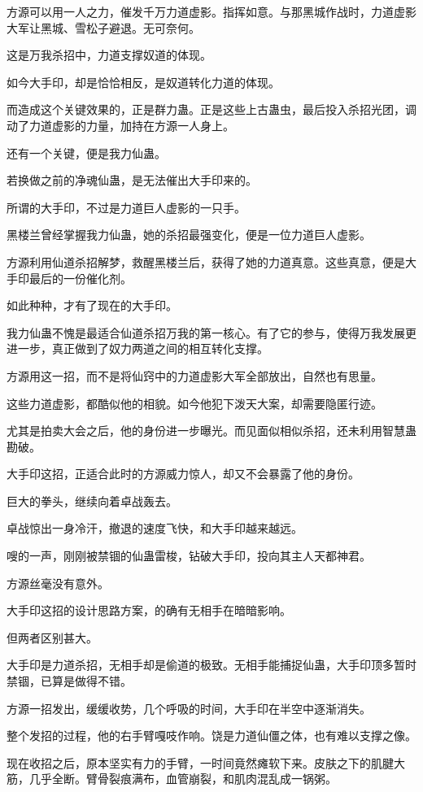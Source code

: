 \begin{this_body}
方源可以用一人之力，催发千万力道虚影。指挥如意。与那黑城作战时，力道虚影大军让黑城、雪松子避退。无可奈何。

这是万我杀招中，力道支撑奴道的体现。

如今大手印，却是恰恰相反，是奴道转化力道的体现。

而造成这个关键效果的，正是群力蛊。正是这些上古蛊虫，最后投入杀招光团，调动了力道虚影的力量，加持在方源一人身上。

还有一个关键，便是我力仙蛊。

若换做之前的净魂仙蛊，是无法催出大手印来的。

所谓的大手印，不过是力道巨人虚影的一只手。

黑楼兰曾经掌握我力仙蛊，她的杀招最强变化，便是一位力道巨人虚影。

方源利用仙道杀招解梦，救醒黑楼兰后，获得了她的力道真意。这些真意，便是大手印最后的一份催化剂。

如此种种，才有了现在的大手印。

我力仙蛊不愧是最适合仙道杀招万我的第一核心。有了它的参与，使得万我发展更进一步，真正做到了奴力两道之间的相互转化支撑。

方源用这一招，而不是将仙窍中的力道虚影大军全部放出，自然也有思量。

这些力道虚影，都酷似他的相貌。如今他犯下泼天大案，却需要隐匿行迹。

尤其是拍卖大会之后，他的身份进一步曝光。而见面似相似杀招，还未利用智慧蛊勘破。

大手印这招，正适合此时的方源威力惊人，却又不会暴露了他的身份。

巨大的拳头，继续向着卓战轰去。

卓战惊出一身冷汗，撤退的速度飞快，和大手印越来越远。

嗖的一声，刚刚被禁锢的仙蛊雷梭，钻破大手印，投向其主人天都神君。

方源丝毫没有意外。

大手印这招的设计思路方案，的确有无相手在暗暗影响。

但两者区别甚大。

大手印是力道杀招，无相手却是偷道的极致。无相手能捕捉仙蛊，大手印顶多暂时禁锢，已算是做得不错。

方源一招发出，缓缓收势，几个呼吸的时间，大手印在半空中逐渐消失。

整个发招的过程，他的右手臂嘎吱作响。饶是力道仙僵之体，也有难以支撑之像。

现在收招之后，原本坚实有力的手臂，一时间竟然瘫软下来。皮肤之下的肌腱大筋，几乎全断。臂骨裂痕满布，血管崩裂，和肌肉混乱成一锅粥。


\end{this_body}
